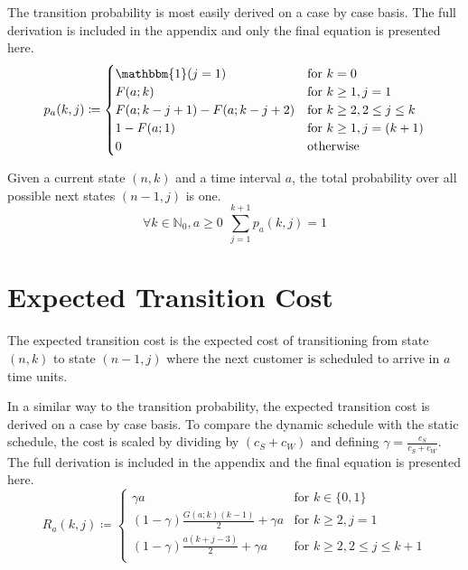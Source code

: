 The transition probability is most easily derived on a case by case basis. The full derivation is included in the appendix and only the final equation is presented here.
\begin{equation}
	p_{a} (k, j) \coloneqq \begin{cases}
		\mathbbm{1} (j = 1) & \text{for $k = 0$} \\
		F (a; k) & \text{for $k \geq 1, j = 1$} \\
		F (a; k - j + 1) - F (a; k - j + 2) & \text{for $k \geq 2, 2 \leq j \leq k$} \\
		1 - F (a; 1) & \text{for $k \geq 1, j = (k + 1)$} \\
		0 & \text{otherwise}
	\end{cases}
\end{equation}

Given a current state $(n, k)$ and a time interval $a$, the total probability over all possible next states $(n - 1, j)$ is one.
\begin{equation}
	\forall k \in \mathbb{N}_{0}, a \geq 0 \ \ \sum_{j = 1}^{k + 1} p_{a} (k, j) = 1
\end{equation}

\section{Expected Transition Cost}
The expected transition cost is the expected cost of transitioning from state $(n, k)$ to state $(n - 1, j)$ where the next customer is scheduled to arrive in $a$ time units.

In a similar way to the transition probability, the expected transition cost is derived on a case by case basis. To compare the dynamic schedule with the static schedule, the cost is scaled by dividing by $(c_{S} + c_{W})$ and defining $\gamma = \frac{c_{S}}{c_{S} + c_{W}}$. The full derivation is included in the appendix and the final equation is presented here.
\begin{equation}
	R_{a} (k, j) \coloneqq \begin{cases}
		\gamma a & \text{for $k \in \{ 0, 1 \}$} \\
		(1 - \gamma) \frac{G (a; k) (k - 1)}{2} + \gamma a & \text{for $k \geq 2, j = 1$} \\
		(1 - \gamma) \frac{a (k + j - 3)}{2} + \gamma a & \text{for $k \geq 2, 2 \leq j \leq k + 1$} \\
	\end{cases}
\end{equation}

